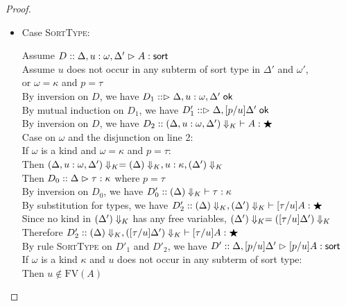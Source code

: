 \begin{proof}
\begin{enumerate}
\begin{itemize}
  \item Case \textsc{SortType}: 
    \begin{tabbedproof}
      \oo Assume $D :: \judgeSort[\Delta, u:\omega, \Delta']{A}$ \\
      \oo Assume $u$ does not occur in any subterm of sort type in $\Delta'$ and $\omega'$, \\
      \ox or $\omega = \kappa$ and $p = \tau$\\
      \ooo By inversion on $D$, we have $D_1 :: \judgeACtx{\Delta, u:\omega, \Delta'}$ \\
      \ooo By mutual induction on $D_1$, we have $D'_1 :: \judgeACtx{\Delta, [p/u]\Delta'}$ \\
      \ooo By inversion on $D$, we have $D_2 :: \judgeWK[\restrictkind{\Delta, u:\omega, \Delta'}]
                                                        {A}{\bigstar}$ \\
      \ooo Case on $\omega$ and the disjunction on line 2: \\
      \oooo If $\omega$ is a kind and $\omega = \kappa$ and $p = \tau$: \\
      \ooooo Then $\restrictkind{\Delta, u:\omega, \Delta'} = 
                     \restrictkind{\Delta}, u:\kappa, \restrictkind{\Delta'}$ \\
      \ooooo Then $D_0 :: \judgeA[\Delta]{\tau}{\kappa}$  where $p = \tau$ \\
      \ooooo By inversion on $D_0$, we have $D'_0 :: \judgeWK[\restrictkind{\Delta}]{\tau}{\kappa}$ \\
      \ooooo By substitution for types, we have 
               $D'_2 :: \judgeWK[\restrictkind{\Delta}, \restrictkind{\Delta'}]
                                {[\tau/u]A}{\bigstar}$ \\
      \ooooo Since no kind in $\restrictkind{\Delta'}$ has any free variables, 
             $\restrictkind{\Delta'} = \restrictkind{[\tau/u]\Delta'}$ \\
      \ooooo Therefore $D'_2 :: \judgeWK[{\restrictkind{\Delta}, \restrictkind{[\tau/u]\Delta'}}]
                                {[\tau/u]A}{\bigstar}$ \\
      \ooooo By rule \textsc{SortType} on $D'_1$ and $D'_2$, we have 
               $D' :: \judgeSort[{\Delta, [p/u]\Delta'}]{[p/u]A}$ \\
      \oooo If $\omega$ is a kind $\kappa$ and $u$ does not occur in any subterm of sort type: \\
      \ooooo Then $u \not\in \mathrm{FV}(A)$ \\

\end{tabbedproof}
\end{itemize}
\end{enumerate}
\end{proof}
